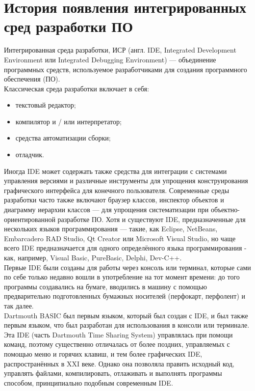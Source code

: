 \chapter{История появления интегрированных сред разработки ПО}
\label{cha:ch_1}
Интегрированная среда разработки, ИСР (англ. IDE, Integrated Development Environment или Integrated Debugging Environment) — объединение программных средств, используемое разработчиками для создания программного обеспечения (ПО).\\
Классическая среда разработки включает в себя:\\
\begin{itemize}
    \item текстовый редактор;\\
    \item компилятор и / или интерпретатор;\\
    \item средства автоматизации сборки;\\
    \item отладчик.\\
\end{itemize}

Иногда IDE может содержать также средства для интеграции с системами управления версиями и различные инструменты для упрощения конструирования графического интерфейса для конечного пользователя. 
Современные среды разработки часто также включают браузер классов, инспектор объектов и диаграмму иерархии классов — для упрощения систематизации при объектно-ориентированной разработке ПО. 
Хотя и существуют IDE, предназначенные для нескольких языков программирования — такие, как Eclipse, NetBeans, Embarcadero RAD Studio, Qt Creator или Microsoft Visual Studio, но чаще всего IDE предназначается для одного определённого языка программирования - как, например, Visual Basic, PureBasic, Delphi, Dev-C++.\\

Первые IDE были созданы для работы через консоль или терминал, которые сами по себе только недавно вошли в употребление на тот момент времени: до того программы создавались на бумаге, вводились в машину с помощью предварительно подготовленных бумажных носителей (перфокарт, перфолент) и так далее.\\

Dartmouth BASIC был первым языком, который был создан с IDE, и был также первым языком, что был разработан для использования в консоли или терминале. Эта IDE (часть Dartmouth Time Sharing System) управлялась при помощи команд, поэтому существенно отличалась от более поздних, управляемых с помощью меню и горячих клавиш, и тем более графических IDE, распространённых в XXI веке. Однако она позволяла править исходный код, управлять файлами, компилировать, отлаживать и выполнять программы способом, принципиально подобным современным IDE.\\

